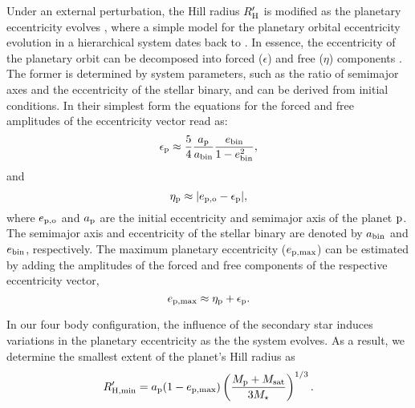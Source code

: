 \documentclass[preprint]{aastex63}
\begin{document}
Under an external perturbation, the Hill radius $R_{\rm H}^\prime$ is modified as the planetary eccentricity evolves \citep{georgakarakos2003eccentricity}, where a simple model for the planetary orbital eccentricity evolution in a hierarchical system dates back to \citet{heppenheimer1978ecc}. In essence, the eccentricity of the planetary orbit can be decomposed into forced ($\epsilon$) and free ($\eta$) components \citep{andrade2017secular}. The former is determined by system parameters, such as the ratio of semimajor axes and the eccentricity of the stellar binary, and can be derived from initial conditions. 
In their simplest form the equations for the forced and free amplitudes of the eccentricity vector read as:
\begin{equation}
    \epsilon_{\rm p}\approx\frac{5}{4}\frac{a_{\rm p}}{a_{\rm bin}}\frac{e_{\rm bin}}{1-e_{\rm bin}^2},
	\label{eq:eforced}
\end{equation}
and
\begin{equation}
    \eta_{\rm p}\approx |e_{\rm p,o}-\epsilon_{\rm p}|,
	\label{eq:efree}
\end{equation}
where $e_{\rm p,o}$ and $a_{\rm p}$ are the initial eccentricity and semimajor axis of the planet ${\rm p}$. The semimajor axis and eccentricity of the stellar binary are denoted by $a_{\rm bin}$ and $e_{\rm bin}$, respectively.
The maximum planetary eccentricity ($e_{\rm p,max}$) can be estimated by adding the amplitudes of the forced and free components of the respective eccentricity vector,
\begin{equation}
    e_{\rm p,max}\approx \eta_{\rm p} + \epsilon_{\rm p}.
	\label{eq:emax}
\end{equation}

In our four body configuration, the influence of the secondary star induces variations in the planetary eccentricity as the the system evolves.  As a result, we determine the smallest extent of the planet's Hill radius as 
\begin{equation}
    R^\prime_{\rm H, min} =  a_{\rm p} (1-e_{\rm p,max}) \left(\frac{M_{\rm p}+M_{\rm sat}}{3M_{\star}}\right)^{1/3}.
	\label{eq:rHmin}
\end{equation}
\end{document}
